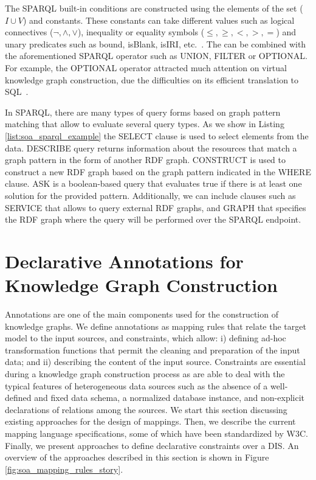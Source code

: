 \begin{table}[!ht]
\centering
\caption{Example of a SPARQL result-set}
\label{tab:soa_result_set}
\end{table}

The SPARQL built-in conditions are constructed using the elements of the set ($I \cup V$) and constants. These constants can take different values such as logical connectives ($\neg,\wedge,\vee $), inequality or equality symbols ($\leq,\geq,<,>,= $) and unary predicates such as bound, isBlank, isIRI, etc.~\citep{SPARQL}. The can be combined with the aforementioned SPARQL operator such as UNION, FILTER or OPTIONAL. For example, the OPTIONAL operator attracted much attention on virtual knowledge graph construction, due the difficulties on its efficient translation to SQL~\citep{xiao2018efficient}.

In SPARQL, there are many types of query forms based on graph pattern matching that allow to evaluate several query types. As we show in Listing \ref{list:soa_sparql_example} the SELECT clause is used to select elements from the data. DESCRIBE query returns information about the resources that match a graph pattern in the form of another RDF graph. CONSTRUCT is used to construct a new RDF graph based on the graph pattern indicated in the WHERE clause. ASK is a boolean-based query that evaluates true if there is at least one solution for the provided pattern. Additionally, we can include clauses such as SERVICE that allows to query external RDF graphs, and GRAPH that specifies the RDF graph where the query will be performed over the SPARQL endpoint.

\section{Declarative Annotations for Knowledge Graph Construction}
\label{sec:soa_annotations}
Annotations are one of the main components used for the construction of knowledge graphs. We define annotations as mapping rules that relate the target model to the input sources, and constraints, which allow: i) defining ad-hoc transformation functions that permit the cleaning and preparation of the input data; and ii) describing the content of the input source. Constraints are essential during a knowledge graph construction process as are able to deal with the typical features of heterogeneous data sources such as the absence of a well-defined and fixed data schema, a normalized database instance, and non-explicit declarations of relations among the sources. We start this section discussing existing approaches for the design of mappings. Then, we describe the current mapping language specifications, some of which have been standardized by W3C. Finally, we present approaches to define declarative constraints over a DIS. An overview of the approaches described in this section is shown in Figure \ref{fig:soa_mapping_rules_story}.

